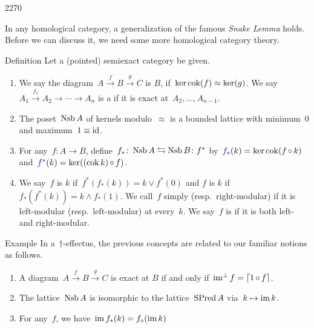\begin{parsec}{2270}%
\begin{point}{10}%
In any homological category, a generalization
    of the famous \emph{Snake Lemma} holds.
Before we can discuss it, we need some more homological category theory.
\end{point}
\begin{point}{20}{Definition}%
Let a (pointed) semiexact category be given.
\begin{enumerate}
\item
    We say the diagram~$A \xrightarrow{f} B \xrightarrow{g} C$
        is  $B$,
        if~$\ker \operatorname{cok} (f) \approx \ker (g)$.
We say~$A_1 \xrightarrow{f_1} A_2 \to \cdots
            \to A_{n}$
            is a 
            if it is exact at~$A_2, \ldots, A_{n-1}$.
\item
The poset~$\operatorname{Nsb} A$ of kernels modulo~$\approx$
        is a bounded lattice with minimum~$0$ and maximum~$1\equiv \operatorname{id}$.
        \cite[\S1.5]{grandis}
\item
For any~$f\colon A \to B$,
    define~$f_*\colon \operatorname{Nsb} A \leftrightarrows \operatorname{Nsb} B \colon f^*$
        by~$\Define{f_*} (k) = \ker \cok (f \after k)$
        and~$\Define{f^*}(k) = \ker ((\cok k) \after f)$.
        \index{$(\ )_*$, $(\ )^*$}
\item
We say~$f$ is  $k$
    if~$f^* (f_* (k)) = k \vee f^*(0)$
        and $f$ is  $k$
        if~$f_*(f^* (k)) = k \wedge f_*(1)$.
We call~$f$ simply  (resp.~right-modular)
    if it is left-modular (resp.~left-modular) at every~$k$.
We say~$f$ is 
    if it is both left- and right-modular.
\end{enumerate}
\end{point}
\begin{point}{30}{Example}%
In a~$\dagger$-effectus, the previous concepts are related
to our familiar notions as follows.
\begin{enumerate}
\item
    A diagram~$A \xrightarrow{f} B \xrightarrow{g} C$
        is exact at $B$
        if and only if~$\operatorname{im^\perp} f = \left\lceil1 \mathop{\circ} f\right\rceil$.
\item
    The lattice~$\operatorname{Nsb} A$ is isomorphic to the lattice~$\operatorname{SPred} A$
        via~$k \mapsto \operatorname{im} k$.
\item
    For any~$f$, we
        have~$\operatorname{im} f_*(k) = f_\diamond (\operatorname{im} k)$

\end{enumerate}
\end{point}
\end{parsec}
